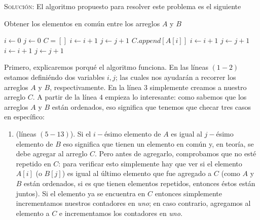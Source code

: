 \documentclass[letterpaper,11pt]{article}
\begin{document}
\begin{enumerate}
    \textsc{Solución:} El algoritmo propuesto para resolver este problema es 
    el siguiente
    \begin{center}
    \begin{minipage}[c]{0.7\textwidth}
    \begin{algorithm}[H]
        \caption{Obtener los elementos en común entre los arreglos $A$ y $B$} 
        \begin{algorithmic}[1]
            \State $i \gets 0$
            \State $j \gets 0$
            \State $C = []$
                        \State $i \gets i + 1$
                        \State $j \gets j + 1$
                    \Else
                        \State $C.append[A[i]]$
                        \State $i \gets i + 1$
                        \State $j \gets j + 1$
                    \EndIf
                \Else {}
                    \State $i \gets i + 1$
                \Else
                    \State $j \gets j + 1$
                \EndIf
                \EndIf
            \EndWhile
        \end{algorithmic} 
    \end{algorithm}
    \end{minipage}
    \end{center}
   
    Primero, explicaremos porqué el algoritmo funciona. En las líneas $(1 - 2)$ 
    estamos definiéndo dos variables $i, j$; las cuales nos ayudarán a recorrer
    los arreglos $A$ y $B$, respectivamente. En la línea $3$ simplemente creamos 
    a nuestro arreglo $C$. A partir de la línea $4$ empieza lo interesante: como
    sabemos que los arreglos $A$ y $B$ están ordenados, eso significa que 
    tenemos que checar tres casos en específico:
    \begin{enumerate}
        \item (líneas $(5 - 13)$). Si el $i-$ésimo elemento de $A$ es igual al 
        $j-$ésimo elemento de $B$ eso significa que tienen un elemento en común 
        y, en teoría, se debe agregar al arreglo $C$. Pero antes de agregarlo,
        comprobamos que no esté repetido en $C$: para verificar esto simplemente
        hay que ver si el elemento $A[i]$ (o $B[j]$) es igual al último elemento 
        que fue agregado a $C$ (como $A$ y $B$ están ordenados, si es que tienen 
        elementos repetidos, entonces éstos están juntos). Si el elemento ya se 
        encuentra en $C$ entonces simplemente incrementamos nuestros contadores 
        en \textit{uno}; en caso contrario, agregamos al elemento a $C$ e 
        incrementamos los contadores en \textit{uno}.


\end{enumerate}
\end{enumerate}
\end{document}
